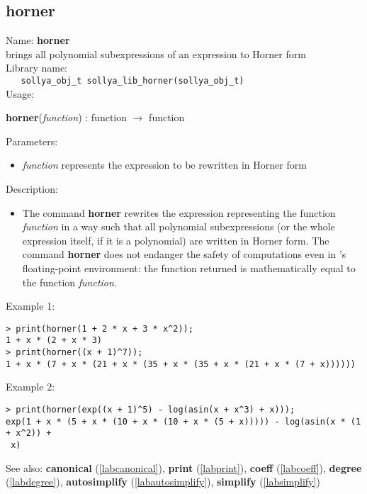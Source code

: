 \subsection{horner}
\label{labhorner}
\noindent Name: \textbf{horner}\\
\phantom{aaa}brings all polynomial subexpressions of an expression to Horner form\\[0.2cm]
\noindent Library name:\\
\verb|   sollya_obj_t sollya_lib_horner(sollya_obj_t)|\\[0.2cm]
\noindent Usage: 
\begin{center}
\textbf{horner}(\emph{function}) : \textsf{function} $\rightarrow$ \textsf{function}\\
\end{center}
Parameters: 
\begin{itemize}
\item \emph{function} represents the expression to be rewritten in Horner form
\end{itemize}
\noindent Description: \begin{itemize}

\item The command \textbf{horner} rewrites the expression representing the function
   \emph{function} in a way such that all polynomial subexpressions (or the
   whole expression itself, if it is a polynomial) are written in Horner
   form.  The command \textbf{horner} does not endanger the safety of
   computations even in \sollya's floating-point environment: the
   function returned is mathematically equal to the function \emph{function}.
\end{itemize}
\noindent Example 1: 
\begin{center}\begin{minipage}{15cm}\begin{Verbatim}[frame=single]
> print(horner(1 + 2 * x + 3 * x^2));
1 + x * (2 + x * 3)
> print(horner((x + 1)^7));
1 + x * (7 + x * (21 + x * (35 + x * (35 + x * (21 + x * (7 + x))))))
\end{Verbatim}
\end{minipage}\end{center}
\noindent Example 2: 
\begin{center}\begin{minipage}{15cm}\begin{Verbatim}[frame=single]
> print(horner(exp((x + 1)^5) - log(asin(x + x^3) + x)));
exp(1 + x * (5 + x * (10 + x * (10 + x * (5 + x))))) - log(asin(x * (1 + x^2)) +
 x)
\end{Verbatim}
\end{minipage}\end{center}
See also: \textbf{canonical} (\ref{labcanonical}), \textbf{print} (\ref{labprint}), \textbf{coeff} (\ref{labcoeff}), \textbf{degree} (\ref{labdegree}), \textbf{autosimplify} (\ref{labautosimplify}), \textbf{simplify} (\ref{labsimplify})
